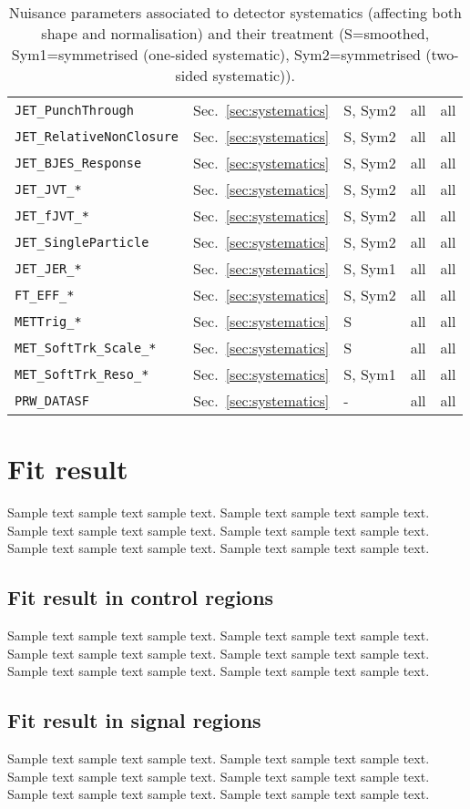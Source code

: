 \begin{table}[ht]
\begin{tabular}{|p{3.5cm}|p{2.0cm}|p{1.5cm}|p{2cm}|p{1.5cm}|}
        \texttt{JET\_PunchThrough} & Sec.~\ref{sec:systematics} & S, Sym2 & all & all \\
        \texttt{JET\_RelativeNonClosure} & Sec.~\ref{sec:systematics} & S, Sym2 & all & all \\
        \texttt{JET\_BJES\_Response} & Sec.~\ref{sec:systematics} & S, Sym2 & all & all \\
        \texttt{JET\_JVT\_*} & Sec.~\ref{sec:systematics} & S, Sym2 & all & all \\
        \texttt{JET\_fJVT\_*} & Sec.~\ref{sec:systematics} & S, Sym2 & all & all \\
        \texttt{JET\_SingleParticle} & Sec.~\ref{sec:systematics} & S, Sym2 & all & all \\
        \texttt{JET\_JER\_*} & Sec.~\ref{sec:systematics} & S, Sym1 & all & all \\
        \texttt{FT\_EFF\_*} & Sec.~\ref{sec:systematics} & S, Sym2 & all & all \\
        \texttt{METTrig\_*} & Sec.~\ref{sec:systematics} & S & all & all \\
        \texttt{MET\_SoftTrk\_Scale\_*} & Sec.~\ref{sec:systematics} & S & all & all \\
        \texttt{MET\_SoftTrk\_Reso\_*} & Sec.~\ref{sec:systematics} & S, Sym1 & all & all \\
        \texttt{PRW\_DATASF} & Sec.~\ref{sec:systematics} & - & all & all \\
        \hline
        \hline
    \end{tabular}
    \caption{Nuisance parameters associated to detector systematics (affecting both shape and normalisation) and their treatment (S=smoothed, Sym1=symmetrised (one-sided systematic), Sym2=symmetrised (two-sided systematic)).}
    \label{tab:np-det}
\end{table}  


\section{Fit result}
Sample text sample text sample text. Sample text sample text sample text.
Sample text sample text sample text. Sample text sample text sample text.
Sample text sample text sample text. Sample text sample text sample text.

\subsection{Fit result in control regions}
Sample text sample text sample text. Sample text sample text sample text.
Sample text sample text sample text. Sample text sample text sample text.
Sample text sample text sample text. Sample text sample text sample text.

\subsection{Fit result in signal regions}
Sample text sample text sample text. Sample text sample text sample text.
Sample text sample text sample text. Sample text sample text sample text.
Sample text sample text sample text. Sample text sample text sample text.

